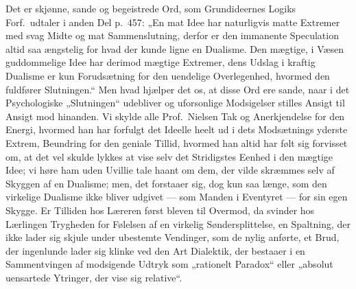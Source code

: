 Det er skjønne, sande og begeistrede Ord, som Grundideernes Logiks Forf.\
udtaler i anden Del p.\ 457: „En mat Idee har naturligvis matte Extremer med
svag Midte og mat Sammenslutning, derfor er den immanente Speculation altid saa
ængstelig for hvad der kunde ligne en Dualisme. Den mægtige, i
\opage{61}Væsen guddommelige Idee har derimod mægtige Extremer, dens Udslag i
kraftig Dualisme er kun Forudsætning for den uendelige Overlegenhed, hvormed
den fuldfører Slutningen.“ Men hvad hjælper det os, at disse Ord ere sande,
naar i det Psychologiske „Slutningen“ udebliver og uforsonlige Modsigelser
stilles Ansigt til Ansigt mod hinanden. Vi skylde alle Prof.\ Nielsen Tak og
Anerkjendelse for den Energi, hvormed han har forfulgt det Ideelle heelt ud i
dets Modsætnings yderste Extrem, Beundring for den geniale Tillid, hvormed han
altid har følt sig forvisset om, at det vel skulde lykkes at vise selv det
Stridigstes Eenhed i den mægtige Idee; vi høre ham uden Uvillie tale haant om
dem, der vilde skræmmes selv af Skyggen af en Dualisme; men, det forstaaer sig,
dog kun saa længe, som den virkelige Dualisme ikke bliver udgivet --- som
Manden i Eventyret --- for sin egen Skygge. Er Tilliden hos Læreren først
bleven til Overmod, da svinder hos Lærlingen Trygheden for Følelsen af en
virkelig Søndersplittelse, en Spaltning, der ikke lader sig skjule under
ubestemte Vendinger, som de nylig anførte, et Brud, der ingenlunde lader sig
klinke ved den Art Dialektik, der bestaaer i en Sammentvingen af modsigende
Udtryk som „rationelt Paradox“ eller „absolut uensartede Ytringer, der vise sig
relative“\fnmark{*)}{Bemærkningerne p.\ 65.}.

